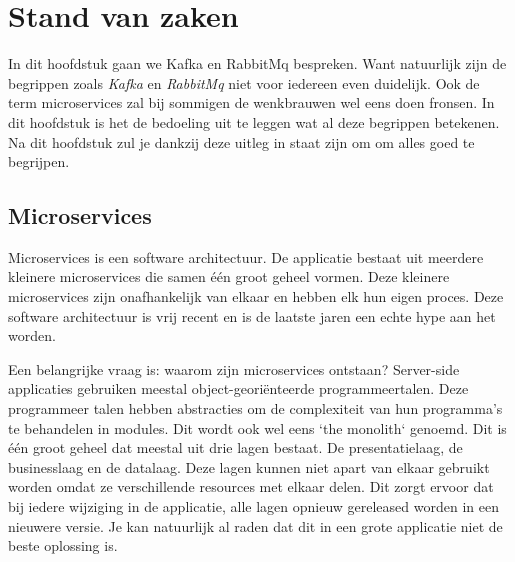 \chapter{Stand van zaken}
\label{ch:stand-van-zaken}

In dit hoofdstuk gaan we Kafka en RabbitMq bespreken. Want natuurlijk zijn de begrippen zoals \emph{Kafka} en \emph{RabbitMq} niet voor iedereen even duidelijk. Ook de term microservices zal bij sommigen de wenkbrauwen wel eens doen fronsen. In dit hoofdstuk is het de bedoeling uit te leggen wat al deze begrippen betekenen. Na dit hoofdstuk zul je dankzij deze uitleg in staat zijn om om alles goed te begrijpen.
\section{Microservices}

Microservices is een software architectuur. De applicatie bestaat uit meerdere kleinere microservices die samen één groot geheel vormen. Deze kleinere microservices zijn onafhankelijk van elkaar en hebben elk hun eigen proces. Deze software architectuur is vrij recent en is de laatste jaren een echte hype aan het worden.

Een belangrijke vraag is: waarom zijn microservices ontstaan? Server-side applicaties gebruiken meestal object-georiënteerde programmeertalen. Deze programmeer talen hebben abstracties om de complexiteit van hun programma's te behandelen in modules. Dit wordt ook wel eens `the monolith` genoemd. Dit is één groot geheel dat meestal uit drie lagen bestaat. De presentatielaag, de businesslaag en de datalaag. Deze lagen kunnen niet apart van elkaar gebruikt worden omdat ze verschillende resources met elkaar delen. Dit zorgt ervoor dat bij iedere wijziging in de applicatie, alle lagen opnieuw gereleased worden in een nieuwere versie. Je kan natuurlijk al raden dat dit in een grote applicatie niet de beste oplossing is. 

